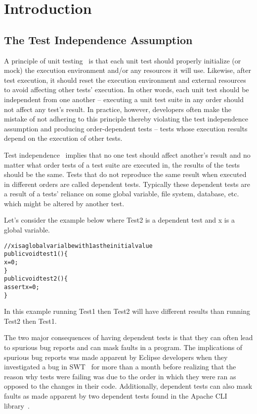 \section{Introduction}
\subsection{The Test Independence Assumption}
A principle of unit testing~\cite{} is that each unit test should properly initialize (or mock) the execution environment and/or any resources it will use. Likewise, after test execution, it should reset the execution environment and external resources to avoid affecting other tests' execution. In other words, each unit test should be independent from one another -- executing a unit test suite in any order should not affect any test's result. In practice, however, developers often make the mistake of not adhering to this principle thereby violating the test independence assumption and producing order-dependent tests -- tests whose execution results depend on the execution of other tests.

Test independence~\cite{} implies that no one test should affect another's result and no matter what order tests of a test suite are executed in, the results of the tests should be the same. Tests that do not reproduce the same result when executed in different orders are called dependent tests. Typically these dependent tests are a result of a tests' reliance on some global variable, file system, database, etc. which might be altered by another test. 

Let's consider the example below where Test2 is a dependent test and x is a global variable.

\begin{CodeOut}
\begin{alltt} 
//x is a global varialbe with 1 as the initial value
public void test1() \{
    x = 0;
\}
public void test2() \{
    assert x = 0;
\}
\end{alltt}
\end{CodeOut}

In this example running Test1 then Test2 will have different results than running Test2 then Test1. 

The two major consequences of having dependent tests is that they can often lead to spurious bug reports and can mask faults in a program. The implications of spurious bug reports was made apparent by Eclipse developers when they investigated a bug in SWT~\cite{} for more than a month before realizing that the reason why tests were failing was due to the order in which they were ran as opposed to the changes in their code. Additionally, dependent tests can also mask faults as made apparent by two dependent tests found in the Apache CLI library~\cite{}.


